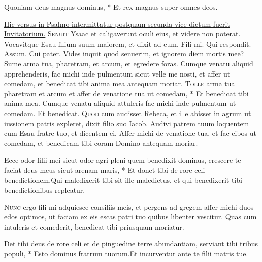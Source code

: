 \begin{multicols*}{2}
\begin{invitatory}
{Quoniam deus magnus dominus, * Et rex magnus super omnes deos.}
\end{invitatory}
\newline \ul{Hic versus in Psalmo intermittatur postquam secunda vice dictum fuerit Invitatorium.}
\lettrine[lines=2]{\zallmancaps \color{Blue} S}{enuit} Ysaac et caligaverunt oculi eius, et videre non poterat. Vocavitque Esau filium suum maiorem, et dixit ad eum. Fili mi. Qui respondit. Assum. Cui pater. Vides inquit quod senuerim, et ignorem diem mortis mee? Sume arma tua, pharetram, et arcum, et egredere foras. Cumque venatu aliquid apprehenderis, fac michi inde pulmentum sicut velle me nosti, et affer ut comedam, et benedicat tibi anima mea antequam moriar. \R
\lettrine[lines=2]{\zallmancaps \color{Red} T}{olle} \hypertarget{tolle-arma}{\label{tolle-arma}} arma tua pharetram et arcum et affer de venatione tua ut comedam, * Et benedicat tibi anima mea. \V Cumque venatu aliquid attuleris fac michi inde pulmentum ut comedam. Et benedicat.
\lettrine[lines=2]{\zallmancaps \color{Blue} Q}{uod} cum audisset Rebeca, et ille abisset in agrum ut iussionem patris expleret, dixit filio suo Iacob. Audivi patrem tuum loquentem cum Esau fratre tuo, et dicentem ei. Affer michi de venatione tua, et fac cibos ut comedam, et benedicam tibi coram Domino antequam moriar.
\begin{responsory}
{Ecce odor filii mei sicut odor agri pleni quem benedixit dominus, crescere te faciat deus meus sicut arenam maris, * Et donet tibi de rore celi benedictionem.}{Qui maledixerit tibi sit ille maledictus, et qui benedixerit tibi benedictionibus repleatur.}
\end{responsory}
\lettrine[lines=2]{\zallmancaps \color{Red} N}{unc} ergo fili mi adquiesce consiliis meis, et pergens ad gregem affer michi duos edos optimos, ut faciam ex eis escas patri tuo quibus libenter vescitur. Quas cum intuleris et comederit, benedicat tibi priusquam moriatur.
\begin{responsory-doxology}
{Det tibi deus de rore celi et de pinguedine terre abundantiam, serviant tibi tribus populi, * Esto dominus fratrum tuorum.}{Et incurventur ante te filii matris tue.}

\end{responsory-doxology}
\end{multicols*}
